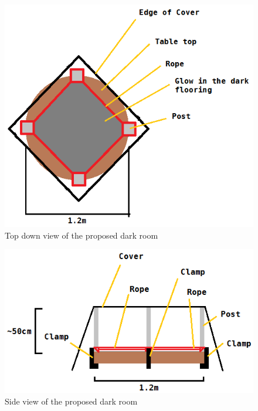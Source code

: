 \begin{figure}
  \includegraphics[scale=0.7]{img/ArenaTopDown.png}
  \caption{Top down view of the proposed dark room} \label{desSysTopImg}
\end{figure}
\begin{figure}
  \includegraphics[scale=0.7]{img/ArenaSideView.png}
  \caption{Side view of the proposed dark room} \label{desSysSideImg}
\end{figure}
\clearpage


